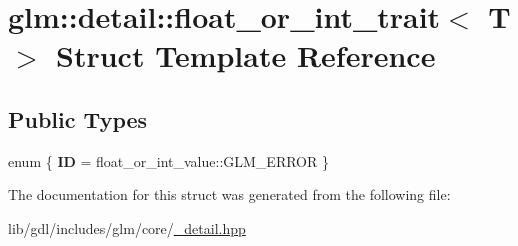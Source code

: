 \hypertarget{structglm_1_1detail_1_1float__or__int__trait}{}\section{glm\+:\+:detail\+:\+:float\+\_\+or\+\_\+int\+\_\+trait$<$ T $>$ Struct Template Reference}
\label{structglm_1_1detail_1_1float__or__int__trait}
\subsection*{Public Types}
\begin{DoxyCompactItemize}
\item 
\hypertarget{structglm_1_1detail_1_1float__or__int__trait_a09268a5fcdea9f3ee22ff768bcd787ca}{}enum \{ {\bfseries I\+D} = float\+\_\+or\+\_\+int\+\_\+value\+:\+:G\+L\+M\+\_\+\+E\+R\+R\+O\+R
 \}\label{structglm_1_1detail_1_1float__or__int__trait_a09268a5fcdea9f3ee22ff768bcd787ca}

\end{DoxyCompactItemize}


The documentation for this struct was generated from the following file\+:\begin{DoxyCompactItemize}
\item 
lib/gdl/includes/glm/core/\hyperlink{__detail_8hpp}{\+\_\+detail.\+hpp}\end{DoxyCompactItemize}
